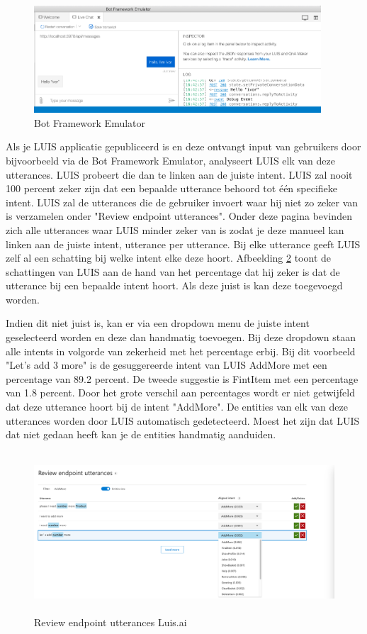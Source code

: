 \begin{figure}[h!]
	\centering
	\includegraphics[height=4cm]{img/emulator.png}
	\caption{Bot Framework Emulator}
	\label{fig:emulator}
\end{figure}

Als je LUIS applicatie gepubliceerd is en deze ontvangt input van gebruikers door bijvoorbeeld via de Bot Framework Emulator, analyseert LUIS elk van deze utterances. LUIS probeert die dan te linken aan de juiste intent. LUIS zal nooit 100 percent zeker zijn dat een bepaalde utterance behoord tot één specifieke intent. LUIS zal de utterances die de gebruiker invoert waar hij niet zo zeker van is verzamelen onder "Review endpoint utterances". Onder deze pagina bevinden zich alle utterances waar LUIS minder zeker van is zodat je deze manueel kan linken aan de juiste intent, utterance per utterance. Bij elke utterance geeft LUIS zelf al een schatting bij welke intent elke deze hoort. Afbeelding \ref{fig:review} toont de schattingen van LUIS aan de hand van het percentage dat hij zeker is dat de utterance bij een bepaalde intent hoort. Als deze juist is kan deze toegevoegd worden. 

Indien dit niet juist is, kan er via een dropdown menu de juiste intent geselecteerd worden en deze dan handmatig toevoegen. Bij deze dropdown staan alle intents in volgorde van zekerheid met het percentage erbij. Bij dit voorbeeld "Let's add 3 more" is de gesuggereerde intent van LUIS AddMore met een percentage van 89.2 percent. De tweede suggestie is FintItem met een percentage van 1.8 percent. Door het grote verschil aan percentages wordt er niet getwijfeld dat deze utterance hoort bij de intent "AddMore". De entities van elk van deze utterances worden door LUIS automatisch gedetecteerd. Moest het zijn dat LUIS dat niet gedaan heeft kan je de entities handmatig aanduiden.

\begin{figure}[h!]
	\centering
	\includegraphics[height=6cm]{img/review.png}
	\caption{Review endpoint utterances Luis.ai}
	\label{fig:review}
\end{figure}

